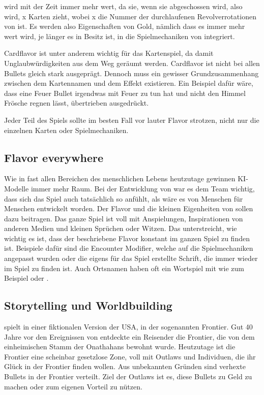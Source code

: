  wird mit der Zeit immer mehr wert, da sie, wenn sie abgeschossen wird, also  wird, x Karten zieht,
wobei x die Nummer der durchlaufenen Revolverrotationen von  ist. Es werden also Eigenschaften von Gold,
nämlich dass es immer mehr wert wird, je länger es in Besitz ist, in die Spielmechaniken von \FF integriert.


Cardflavor ist unter anderem wichtig für das Kartenspiel, da damit Unglaubwürdigkeiten aus dem Weg geräumt werden.
Cardflavor ist nicht bei allen Bullets gleich stark ausgeprägt. Dennoch muss ein gewisser Grundzusammenhang zwischen dem
Kartennamen und dem Effekt existieren. Ein Beispiel dafür wäre, dass eine Feuer Bullet irgendwas mit Feuer zu tun hat und
nicht den Himmel Frösche regnen lässt, übertrieben ausgedrückt.


Jeder Teil des Spiels sollte im besten Fall vor lauter Flavor strotzen, nicht nur die einzelnen Karten oder Spielmechaniken.



\subsection{Flavor everywhere}\label{subsec:keinTeildesSpielesOhneFlavor}

Wie in fast allen Bereichen des menschlichen Lebens heutzutage gewinnen KI-Modelle immer mehr Raum. Bei der Entwicklung von \FF war es dem Team wichtig,
dass sich das Spiel auch tatsächlich so anfühlt, als wäre es von Menschen für Menschen entwickelt worden.
Der Flavor und die kleinen Eigenheiten von \FF sollen dazu beitragen.
Das ganze Spiel ist voll mit Anspielungen, Inspirationen von anderen Medien und kleinen Sprüchen oder Witzen.
Das unterstreicht, wie wichtig es ist, dass der beschriebene Flavor konstant im ganzen Spiel zu finden ist.
Beispiele dafür sind die Encounter Modifier, welche auf die Spielmechaniken
angepasst wurden oder die eigens für das Spiel erstellte Schrift, die immer wieder im Spiel zu finden ist. Auch Ortsnamen
haben oft ein Wortspiel mit  wie zum Beispiel  oder .


\subsection{Storytelling und Worldbuilding}\label{subsec:storytellingUndWorldbuilding}

\FF spielt in einer fiktionalen Version der USA, in der sogenannten Frontier. Gut 40 Jahre vor den Ereignissen von \FF
entdeckte ein Reisender die Frontier, die von dem einheimischen Stamm der Onathahans bewohnt wurde. Heutzutage ist die Frontier
eine scheinbar gesetzlose Zone, voll mit Outlaws und Individuen, die ihr Glück in der Frontier finden wollen.
Aus unbekannten Gründen sind verhexte Bullets in der Frontier verteilt. Ziel der Outlaws ist es, diese Bullets zu Geld
zu machen oder zum eigenen Vorteil zu nützen.


